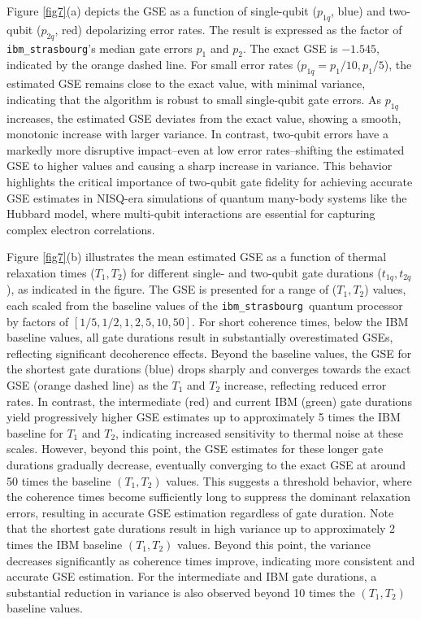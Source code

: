 \documentclass[twocolumn,superscriptaddress,amsmath,amssymb,showpacs,floatfix,preprintnumbers]{revtex4-1}
\newcommand{\ibmstr}{\texttt{ibm\_strasbourg}}
\begin{document}
Figure \ref{fig7}(a) depicts the GSE as a function of single-qubit ($p_{1q}$, blue) and two-qubit 
($p_{2q}$, red) depolarizing error rates.
%
The result is expressed as the factor of \ibmstr's median gate errors $p_1$ and $p_2$.
%
The exact GSE is $-1.545$, indicated by the orange dashed line.
%
For small error rates ($p_{1q} = p_1/10, p_1/5$), the estimated GSE remains close to the exact value,
with minimal variance, indicating that the algorithm is robust to small single-qubit gate errors.
%
As $p_{1q}$ increases, the estimated GSE deviates from the exact value, showing a smooth, monotonic
increase with larger variance. 
%
In contrast, two-qubit errors have a markedly more disruptive impact--even at low error
rates--shifting the estimated GSE to higher values and causing a sharp increase in variance.
%
This behavior highlights the critical importance of two-qubit gate fidelity for achieving accurate 
GSE estimates in NISQ-era simulations of quantum many-body systems like the Hubbard model, 
where multi-qubit interactions are essential for capturing complex electron correlations.

Figure \ref{fig7}(b) illustrates the mean estimated GSE as a function of thermal relaxation 
times ($T_1, T_2$) for different single- and two-qubit gate durations ($t_{1q}, t_{2q}$), 
as indicated in the figure.
%
The GSE is presented for a range of ($T_1, T_2$) values, each scaled from the baseline values 
of the \ibmstr\ quantum processor by factors of $[1/5, 1/2, 1, 2, 5, 10, 50]$.
%
For short coherence times, below the IBM baseline values, all gate durations result in 
substantially overestimated GSEs, reflecting significant decoherence effects. 
%
Beyond the baseline values, the GSE for the shortest gate durations (blue) drops sharply and
converges towards the exact GSE (orange dashed line) as the $T_1$ and $T_2$ increase, reflecting
reduced error rates.
%
In contrast, the intermediate (red) and current IBM (green) gate durations yield progressively
higher GSE estimates up to approximately 5 times the IBM baseline for $T_1$ and $T_2$, indicating
increased sensitivity to thermal noise at these scales.
%
However, beyond this point, the GSE estimates for these longer gate durations gradually decrease,
eventually converging to the exact GSE at around 50 times the baseline $(T_1, T_2)$ values.
%
This suggests a threshold behavior, where the coherence times become sufficiently long to suppress
the dominant relaxation errors, resulting in accurate GSE estimation regardless of gate duration.
%
Note that the shortest gate durations result in high variance up to approximately 2 times the IBM
baseline $(T_1, T_2)$ values. 
%
Beyond this point, the variance decreases significantly as coherence times improve, indicating 
more consistent and accurate GSE estimation.
%
For the intermediate and IBM gate durations, a substantial reduction in variance is also observed
beyond 10 times the $(T_1, T_2)$ baseline values.
\end{document}

